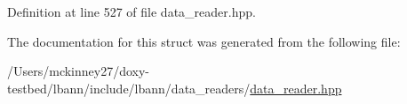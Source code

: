 Definition at line 527 of file data\+\_\+reader.\+hpp.



The documentation for this struct was generated from the following file\+:\begin{DoxyCompactItemize}
\item 
/\+Users/mckinney27/doxy-\/testbed/lbann/include/lbann/data\+\_\+readers/\hyperlink{data__reader_8hpp}{data\+\_\+reader.\+hpp}\end{DoxyCompactItemize}
